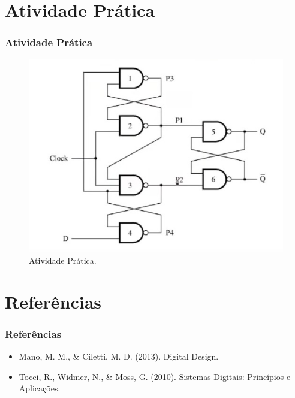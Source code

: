 \documentclass{beamer}
\begin{document}
\section{Atividade Prática}


 \begin{frame}
\frametitle{Atividade Prática}
\begin{figure}
    \centering
    \includegraphics[width=0.7\columnwidth]{figures/Atividade_Pratica.jpeg}
    \caption{Atividade Prática.}
\end{figure}
\end{frame}

\section{Referências}
\begin{frame}
\frametitle{Referências}
\begin{itemize}
    \item Mano, M. M., \& Ciletti, M. D. (2013). Digital Design.
    \item Tocci, R., Widmer, N., \& Moss, G. (2010). Sistemas Digitais: Princípios e Aplicações.
\end{itemize}
\end{frame}
\end{document}

